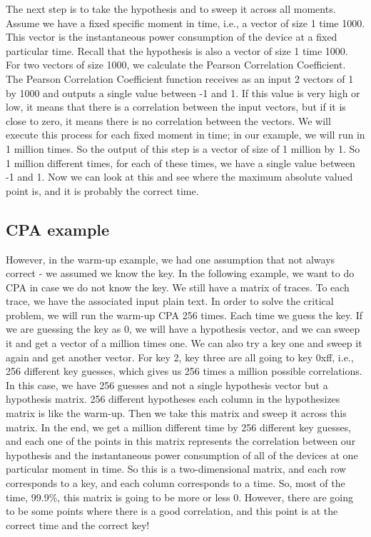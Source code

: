The next step is to take the hypothesis and to sweep it across all moments. Assume we have a fixed specific moment in time, i.e., a vector of size 1
time 1000. This vector is the instantaneous power consumption of the device at
a fixed particular time. Recall that the hypothesis is also a vector of size 1
time 1000. For two vectors of size 1000, we calculate the Pearson Correlation
Coefficient. The Pearson Correlation Coefficient function receives as an input 2
vectors of 1 by 1000 and outputs a single value between -1 and 1. If this value
is very high or low, it means that there is a correlation between the input
vectors, but if it is close to zero, it means there is no correlation between the
vectors. We will execute this process for each fixed moment in time; in our
example, we will run in 1 million times. So the output of this step is a vector
of size of 1 million by 1. So 1 million different times, for each of these
times, we have a single value between -1 and 1. Now we can look at this and see
where the maximum absolute valued point is, and it is probably the correct time.

\subsection{CPA example}\label{c8_CPA_example:subsec}

However, in the warm-up example, we had one assumption that not always correct -
we assumed we know the key. In the following example, we want to do CPA in case
we do not know the key. We still have a matrix of traces. To each trace, we have
the associated input plain text. In order to solve the critical problem, we will run
the warm-up CPA 256 times. Each time we guess the key. If we are guessing the
key as 0, we will have a hypothesis vector, and we can sweep it and get a vector
of a million times one. We can also try a key one and sweep it again and get another
vector. For key 2, key three are all going to key 0xff, i.e., 256 different key
guesses, which gives us 256 times a million possible correlations. In this case,
we have 256 guesses and not a single hypothesis vector but a hypothesis matrix.
256 different hypotheses each column in the hypothesizes matrix is like the
warm-up. Then we take this matrix and sweep it across this matrix. In the end, we
get a million different time by 256 different key guesses, and each one of the
points in this matrix represents the correlation between our hypothesis and the
instantaneous power consumption of all of the devices at one particular moment
in time. So this is a two-dimensional matrix, and each row corresponds to a key, and each column corresponds to a time. So, most of the time, 99.9\%, this
matrix is going to be more or less 0. However, there are going to be some points where
there is a good correlation, and this point is at the correct time and the
correct key!

